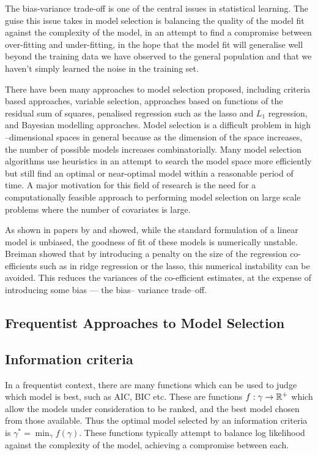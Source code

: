 The bias-variance trade-off is one of the central issues in statistical learning. The guise this issue takes
in model selection is balancing the quality of the model fit against the complexity of the model, in an
attempt to find a compromise between over-fitting and under-fitting, in the hope that the model fit will
generalise well beyond the training data we have observed to the general population and that we haven't simply
learned the noise in the training set.

There have been many approaches to model selection proposed, including criteria based approaches, variable
selection, approaches based on functions of the residual sum of squares, penalised regression such as the
lasso and $L_1$ regression, and Bayesian modelling approaches. Model selection is a difficult problem in high
--dimensional spaces in general because as the dimension of the space increases, the number of possible models
increases combinatorially. Many model selection algorithms use heuristics in an attempt to search the model
space more efficiently but still find an optimal or near-optimal model within a reasonable period of time. A
major motivation for this field of research is the need for a computationally feasible approach to performing
model selection on large scale problems where the number of covariates is large.

As shown in papers by \citep{Breiman1996} and \citep{Efron2013} showed, while the standard formulation of a
linear model is unbiased, the goodness of fit of these models is numerically  unstable. Breiman showed that by
introducing a penalty on the size of the regression co- efficients such as  in ridge regression or the lasso,
this numerical instability can be avoided. This reduces the variances of the co-efficient estimates, at the
expense of introducing some bias --- the bias-- variance trade--off.

\subsection{Frequentist Approaches to Model Selection}
\subsection{Information criteria}
In a frequentist context, there are many functions which can be used to judge which model is best, such as
AIC, BIC etc. These are functions $f: \gamma \to {\mathbb{R}}^+$ which allow the models under consideration to be
ranked, and the best model chosen from those available. Thus the optimal model selected by an information
criteria is $\gamma^* = \min_\gamma f(\gamma)$. These functions typically attempt to balance log likelihood
against the complexity of the model, achieving a compromise between each.

